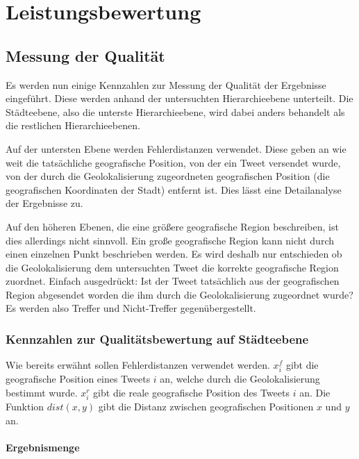 \chapter{Leistungsbewertung} 



	\section{Messung der Qualität}

		Es werden nun einige Kennzahlen zur Messung der Qualität der Ergebnisse eingeführt.
		Diese werden anhand der untersuchten Hierarchieebene unterteilt.
		Die Städteebene, also die unterste Hierarchieebene, wird dabei anders behandelt als die restlichen Hierarchieebenen.

		Auf der untersten Ebene werden Fehlerdistanzen verwendet.
		Diese geben an wie weit die tatsächliche geografische Position, von der ein Tweet versendet wurde, von der durch die Geolokalisierung zugeordneten geografischen Position (die geografischen Koordinaten der Stadt) entfernt ist.
		Dies lässt eine Detailanalyse der Ergebnisse zu.

		Auf den höheren Ebenen, die eine größere geografische Region beschreiben, ist dies allerdings nicht sinnvoll.
		Ein große geografische Region kann nicht durch einen einzelnen Punkt beschrieben werden. 
		Es wird deshalb nur entschieden ob die Geolokalisierung dem untersuchten Tweet die korrekte geografische Region zuordnet. 
		Einfach ausgedrückt: Ist der Tweet tatsächlich aus der geografischen Region abgesendet worden die ihm durch die Geolokalisierung zugeordnet wurde?
		Es werden also Treffer und Nicht-Treffer gegenübergestellt. 
		
		\subsection{Kennzahlen zur Qualitätsbewertung auf Städteebene}

			Wie bereits erwähnt sollen Fehlerdistanzen verwendet werden. 
			$x^f_{i}$ gibt die geografische Position eines Tweets $i$ an, welche durch die Geolokalisierung bestimmt wurde.
			$x^r_{i}$ gibt die reale geografische Position des Tweets $i$ an. 
			Die Funktion $dist(x,y)$ gibt die Distanz zwischen geografischen Positionen $x$ und $y$ an.

			\subsubsection{Ergebnismenge}

